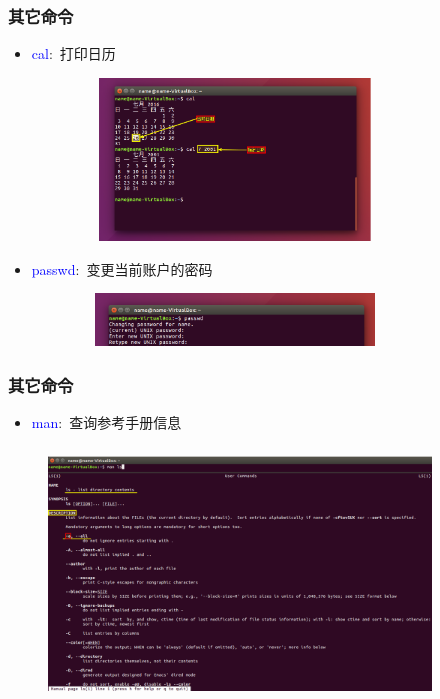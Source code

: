\frame
{
	\frametitle{其它命令}
	\begin{itemize}
\setlength{\itemsep}{-5pt}
		\item \textcolor{blue}{cal}:~打印日历
\begin{figure}[h!]
\centering
\vspace{-5.5pt}
\includegraphics[height=1.7in,width=3.4in,viewport=0 110 700 480,clip]{Figures/Ubuntu-cal.png}
\label{Linux-command-cal}
\end{figure}
		\item \textcolor{blue}{passwd}:~变更当前账户的密码
\begin{figure}[h!]
\centering
\vspace{-5.5pt}
\includegraphics[height=0.55in,width=3.4in,viewport=0 0 700 120,clip]{Figures/Ubuntu-passwd.png}
\label{Linux-command-passwd}
\end{figure}
\end{itemize}
}

\frame
{
	\frametitle{其它命令}
	\begin{itemize}
		\item \textcolor{blue}{man}:~查询参考手册信息
	\end{itemize}
\begin{figure}[h!]
\centering
\vspace{-7.5pt}
\includegraphics[height=2.65in,width=4.0in,viewport=0 0 1410 860,clip]{Figures/Ubuntu-man.png}
\label{Linux-command-man}
\end{figure}
}

